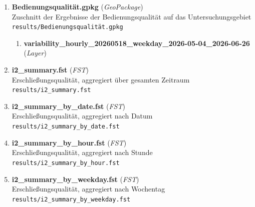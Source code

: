 \begin{enumerate}[label=A\arabic*, ref=A\arabic*, leftmargin=*, itemsep=0.5em, topsep=0.3em]
\begin{enumerate}[label=A\arabic{enumi}-\arabic*, ref=A\arabic{enumi}-\arabic*, leftmargin=*, itemsep=0.5em, topsep=0.3em]
\begin{enumerate}[label=A\arabic{enumi}-\arabic{enumii}-\arabic*, ref=A\arabic{enumi}-\arabic{enumii}-\arabic*, leftmargin=*, itemsep=0.5em, topsep=0.3em]
\edef\appendixlabelkey{app:A\arabic{enumi}-\arabic{enumii}-\arabic{enumiii}}
\expandafter\label\expandafter{\appendixlabelkey}
\end{enumerate}
\item \textbf{Bedienungsqualität.gpkg} \textnormal{(\textit{GeoPackage})}\\
Zuschnitt der Ergebnisse der Bedienungsqualität auf das Untersuchungsgebiet\\
\texttt{\small results/Bedienungsqualität.gpkg}
\edef\appendixlabelkey{app:A\arabic{enumi}-\arabic{enumii}}
\expandafter\label\expandafter{\appendixlabelkey}
\begin{enumerate}[label=A\arabic{enumi}-\arabic{enumii}-\arabic*, ref=A\arabic{enumi}-\arabic{enumii}-\arabic*, leftmargin=*, itemsep=0.5em, topsep=0.3em]
\item \textbf{variability\_hourly\_20260518\_weekday\_2026-05-04\_2026-06-26} \textnormal{(\textit{Layer})}
\edef\appendixlabelkey{app:A\arabic{enumi}-\arabic{enumii}-\arabic{enumiii}}
\expandafter\label\expandafter{\appendixlabelkey}
\end{enumerate}
\item \textbf{i2\_summary.fst} \textnormal{(\textit{FST})}\\
Erschließungsqualität, aggregiert über gesamten Zeitraum\\
\texttt{\small results/i2\_summary.fst}
\edef\appendixlabelkey{app:A\arabic{enumi}-\arabic{enumii}}
\expandafter\label\expandafter{\appendixlabelkey}
\item \textbf{i2\_summary\_by\_date.fst} \textnormal{(\textit{FST})}\\
Erschließungsqualität, aggregiert nach Datum\\
\texttt{\small results/i2\_summary\_by\_date.fst}
\edef\appendixlabelkey{app:A\arabic{enumi}-\arabic{enumii}}
\expandafter\label\expandafter{\appendixlabelkey}
\item \textbf{i2\_summary\_by\_hour.fst} \textnormal{(\textit{FST})}\\
Erschließungsqualität, aggregiert nach Stunde\\
\texttt{\small results/i2\_summary\_by\_hour.fst}
\edef\appendixlabelkey{app:A\arabic{enumi}-\arabic{enumii}}
\expandafter\label\expandafter{\appendixlabelkey}
\item \textbf{i2\_summary\_by\_weekday.fst} \textnormal{(\textit{FST})}\\
Erschließungsqualität, aggregiert nach Wochentag\\
\texttt{\small results/i2\_summary\_by\_weekday.fst}

\end{enumerate}
\end{enumerate}
